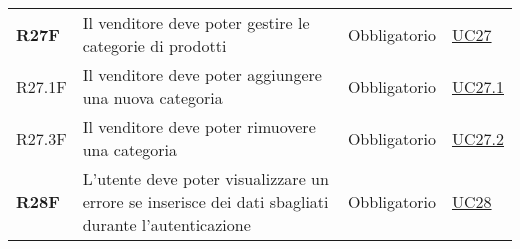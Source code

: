 \begin{center}
\begin{longtable}[!h]{p{50px} p{245px} p{75px} p{50px}}
        \textbf{R27F}                         & Il venditore deve poter gestire le categorie di prodotti                                                   & Obbligatorio             & \hyperref[sec:UC27]{UC27}                    \\
        R27.1F                                & Il venditore deve poter aggiungere una nuova categoria                                                     & Obbligatorio             & \hyperref[sec:UC27.1]{UC27.1}                \\
        R27.3F                                & Il venditore deve poter rimuovere una categoria                                                            & Obbligatorio             & \hyperref[sec:UC27.2]{UC27.2}                \\
        \textbf{R28F}                         & L'utente deve poter visualizzare un errore se inserisce dei dati sbagliati durante l'autenticazione        & Obbligatorio             & \hyperref[sec:UC28]{UC28}                    \\
    \end{longtable}
\end{center}

\newpage
